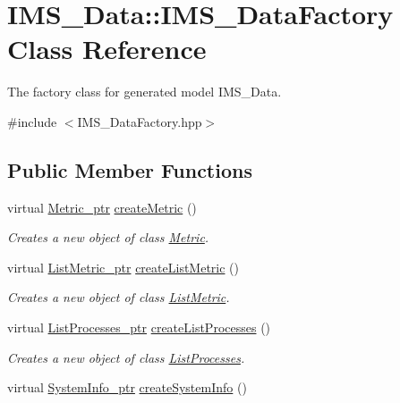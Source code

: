 \hypertarget{classIMS__Data_1_1IMS__DataFactory}{
\section{IMS\_\-Data::IMS\_\-DataFactory Class Reference}
\label{classIMS__Data_1_1IMS__DataFactory}
}


The factory class for generated model IMS\_\-Data.  




{\ttfamily \#include $<$IMS\_\-DataFactory.hpp$>$}

\subsection*{Public Member Functions}
\begin{DoxyCompactItemize}
\item 
virtual \hyperlink{classIMS__Data_1_1Metric}{Metric\_\-ptr} \hyperlink{classIMS__Data_1_1IMS__DataFactory_a234b769b725fb4b8eafca62d5450137d}{createMetric} ()
\begin{DoxyCompactList}\small\item\em Creates a new object of class \hyperlink{classIMS__Data_1_1Metric}{Metric}. \item\end{DoxyCompactList}\item 
virtual \hyperlink{classIMS__Data_1_1ListMetric}{ListMetric\_\-ptr} \hyperlink{classIMS__Data_1_1IMS__DataFactory_ab9514f5274918d3dd60ac0ed8489c57e}{createListMetric} ()
\begin{DoxyCompactList}\small\item\em Creates a new object of class \hyperlink{classIMS__Data_1_1ListMetric}{ListMetric}. \item\end{DoxyCompactList}\item 
virtual \hyperlink{classIMS__Data_1_1ListProcesses}{ListProcesses\_\-ptr} \hyperlink{classIMS__Data_1_1IMS__DataFactory_aaa566643e3e343bb120691f7d33609bf}{createListProcesses} ()
\begin{DoxyCompactList}\small\item\em Creates a new object of class \hyperlink{classIMS__Data_1_1ListProcesses}{ListProcesses}. \item\end{DoxyCompactList}\item 
virtual \hyperlink{classIMS__Data_1_1SystemInfo}{SystemInfo\_\-ptr} \hyperlink{classIMS__Data_1_1IMS__DataFactory_abaacd9ebfcbb0cfc7ab1adb8ec8499d2}{createSystemInfo} ()

\end{DoxyCompactItemize}
